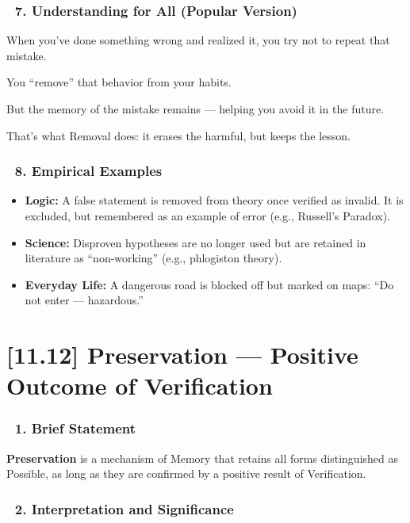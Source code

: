 \documentclass[12pt]{article}
\begin{document}
\subsubsection*{🔹 7. Understanding for All (Popular Version)}

When you’ve done something wrong and realized it, you try not to repeat that mistake.

You “remove” that behavior from your habits.

But the memory of the mistake remains — helping you avoid it in the future.

That’s what Removal does: it erases the harmful, but keeps the lesson.

\subsubsection*{🔹 8. Empirical Examples}

\begin{itemize}
\item \textbf{Logic:} 
A false statement is removed from theory once verified as invalid. It is excluded, but remembered as an example of error (e.g., Russell’s Paradox).

\item \textbf{Science:} 
Disproven hypotheses are no longer used but are retained in literature as ``non-working'' (e.g., phlogiston theory).

\item \textbf{Everyday Life:} 
A dangerous road is blocked off but marked on maps: ``Do not enter — hazardous.''
\end{itemize}

\section*{[11.12] Preservation — Positive Outcome of Verification}

\subsubsection*{🔹 1. Brief Statement}

\textbf{Preservation} is a mechanism of Memory that retains all forms distinguished as Possible, as long as they are confirmed by a positive result of Verification.

\subsubsection*{🔹 2. Interpretation and Significance}
\end{document}
